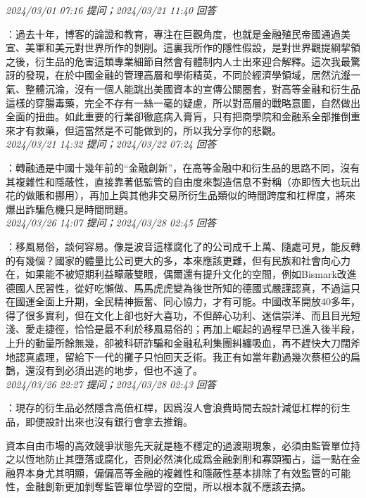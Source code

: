 \documentclass[twocolumn]{ctexart}
\begin{document}
\textit{\hfill\noindent\small 2024/03/01 07:16 提问；2024/03/21 11:40 回答}

：過去十年，博客的論證和教育，專注在巨觀角度，也就是金融殖民帝國通過美宣、美軍和美元對世界所作的剝削。這裏我所作的隱性假設，是對世界觀提綱挈領之後，衍生品的危害這類專業細節自然會有體制内人士出來迎合解釋。這次我最驚訝的發現，在於中國金融的管理高層和學術精英，不同於經濟學領域，居然沆瀣一氣、整體沉淪，沒有一個人能跳出美國資本的宣傳公關圈套，對高等金融和衍生品這樣的穿腸毒藥，完全不存有一絲一毫的疑慮，所以對高層的戰略意圖，自然做出全面的扭曲。如此重要的行業卻徹底病入膏肓，只有把商學院和金融系全部推倒重來才有救藥，但這當然是不可能做到的，所以我分享你的悲觀。
\\

\textit{\hfill\noindent\small 2024/03/21 14:32 提问；2024/03/22 07:24 回答}

：轉融通是中國十幾年前的“金融創新”，在高等金融中和衍生品的思路不同，沒有其複雜性和隱蔽性，直接靠著低監管的自由度來製造信息不對稱（亦即恆大也玩出花的做賬和挪用），再加上與其他非交易所衍生品類似的時間跨度和杠桿度，將來爆出詐騙危機只是時間問題。
\\

\textit{\hfill\noindent\small 2024/03/26 14:07 提问；2024/03/28 02:45 回答}

：移風易俗，談何容易。像是波音這樣腐化了的公司成千上萬、隨處可見，能反轉的有幾個？國家的體量比公司更大的多，本來應該更難，但有民族和社會向心力在，如果能不被短期利益矇蔽雙眼，偶爾還有提升文化的空間，例如Bismark改進德國人民習性，從好吃懶做、馬馬虎虎變為後世所知的德國式嚴謹認真，不過這只在國運全面上升期，全民精神振奮、同心協力，才有可能。中國改革開放40多年，得了很多實利，但在文化上卻也好大喜功，不但醉心功利、迷信崇洋、而且目光短淺、愛走捷徑，恰恰是最不利於移風易俗的；再加上崛起的過程早已進入後半段，上升的動量所餘無幾，卻被科研詐騙和金融私利集團糾纏吸血，再不趕快大刀闊斧地認真處理，留給下一代的攤子只怕回天乏術。我正有如當年勸過幾次蔡桓公的扁鵲，還沒有到必須出逃的地步，但也不遠了。
\\

\textit{\hfill\noindent\small 2024/03/26 22:27 提问；2024/03/28 02:43 回答}

：現存的衍生品必然隱含高倍杠桿，因爲沒人會浪費時間去設計減低杠桿的衍生品，即便設計出來也沒有銀行會拿去推銷。

資本自由市場的高效競爭狀態先天就是極不穩定的過渡期現象，必須由監管單位持之以恆地防止其墮落或腐化，否則必然演化成爲金融剝削和寡頭獨占，這一點在金融界本身尤其明顯，偏偏高等金融的複雜性和隱蔽性基本排除了有效監管的可能性，金融創新更加剝奪監管單位學習的空間，所以根本就不應該去搞。
\\
\end{document}
